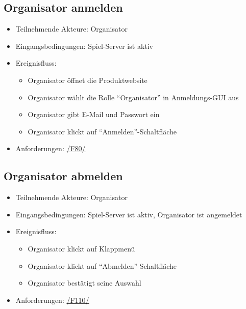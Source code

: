 \documentclass[a4paper]{scrreprt}
\begin{document}
    \subsection{Organisator anmelden}
    \begin{itemize}
        \item Teilnehmende Akteure: \Gls{Organisator}
        \item Eingangsbedingungen: \Gls{Spiel-Server} ist aktiv
        \item Ereignisfluss:
        \begin{itemize}
            \item \Gls{Organisator} öffnet die Produktwebsite
            \item \Gls{Organisator} wählt die Rolle \enquote{\Gls{Organisator}} in Anmeldungs-GUI aus
            \item \Gls{Organisator} gibt E-Mail und Passwort ein
            \item \Gls{Organisator} klickt auf \enquote{Anmelden}-Schaltfläche
        \end{itemize}
        \item Anforderungen: \hyperlink{F80}{/F80/}
    \end{itemize}

    \subsection{Organisator abmelden}
    \begin{itemize}
        \item Teilnehmende Akteure: \Gls{Organisator}
        \item Eingangsbedingungen: \Gls{Spiel-Server} ist aktiv, \Gls{Organisator} ist angemeldet
        \item Ereignisfluss:
        \begin{itemize}
            \item \Gls{Organisator} klickt auf Klappmenü
            \item \Gls{Organisator} klickt auf \enquote{Abmelden}-Schaltfläche
            \item \Gls{Organisator} bestätigt seine Auswahl
        \end{itemize}
        \item Anforderungen: \hyperlink{F110}{/F110/}
    \end{itemize}
\end{document}
